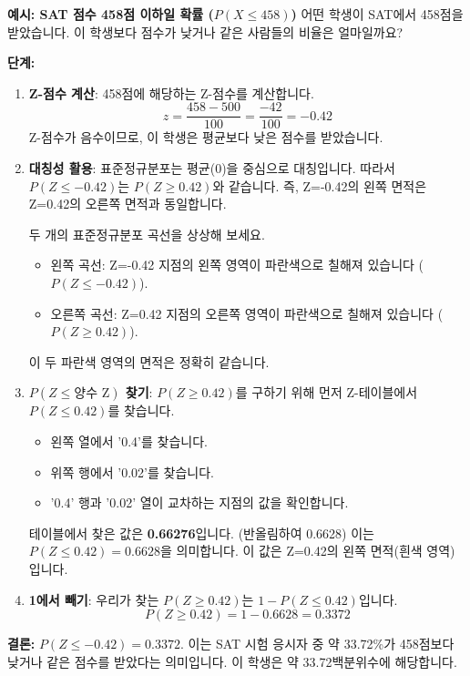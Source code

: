 \documentclass[11pt,a4paper]{article}
\theoremstyle{definition}
\begin{document}
\begin{examplebox}
\textbf{예시: SAT 점수 458점 이하일 확률 ($P(X \le 458)$)}
어떤 학생이 SAT에서 458점을 받았습니다. 이 학생보다 점수가 낮거나 같은 사람들의 비율은 얼마일까요?

\textbf{단계:}
\begin{enumerate}
    \item \textbf{Z-점수 계산}: 458점에 해당하는 Z-점수를 계산합니다.
    \[ z = \frac{458 - 500}{100} = \frac{-42}{100} = -0.42 \]
    Z-점수가 음수이므로, 이 학생은 평균보다 낮은 점수를 받았습니다.
    \item \textbf{대칭성 활용}: 표준정규분포는 평균(0)을 중심으로 대칭입니다. 따라서 $P(Z \le -0.42)$는 $P(Z \ge 0.42)$와 같습니다. 즉, Z=-0.42의 왼쪽 면적은 Z=0.42의 오른쪽 면적과 동일합니다.
    \begin{tcolorbox}[title=\textbf{시각적 이해: 대칭성}, colback=lightblue!50!white, colframe=darkblue]
    두 개의 표준정규분포 곡선을 상상해 보세요.
    \begin{itemize}
        \item 왼쪽 곡선: Z=-0.42 지점의 왼쪽 영역이 파란색으로 칠해져 있습니다 ($P(Z \le -0.42)$).
        \item 오른쪽 곡선: Z=0.42 지점의 오른쪽 영역이 파란색으로 칠해져 있습니다 ($P(Z \ge 0.42)$).
    \end{itemize}
    이 두 파란색 영역의 면적은 정확히 같습니다.
    \end{tcolorbox}
    \item \textbf{$P(Z \le \text{양수 Z})$ 찾기}: $P(Z \ge 0.42)$를 구하기 위해 먼저 Z-테이블에서 $P(Z \le 0.42)$를 찾습니다.
    \begin{itemize}
        \item 왼쪽 열에서 '0.4'를 찾습니다.
        \item 위쪽 행에서 '0.02'를 찾습니다.
        \item '0.4' 행과 '0.02' 열이 교차하는 지점의 값을 확인합니다.
    \end{itemize}
    테이블에서 찾은 값은 \textbf{0.66276}입니다. (반올림하여 0.6628)
    이는 $P(Z \le 0.42) = 0.6628$을 의미합니다. 이 값은 Z=0.42의 왼쪽 면적(흰색 영역)입니다.
    \item \textbf{1에서 빼기}: 우리가 찾는 $P(Z \ge 0.42)$는 $1 - P(Z \le 0.42)$입니다.
    \[ P(Z \ge 0.42) = 1 - 0.6628 = 0.3372 \]
\end{enumerate}
\textbf{결론:} $P(Z \le -0.42) = 0.3372$. 이는 SAT 시험 응시자 중 약 33.72\%가 458점보다 낮거나 같은 점수를 받았다는 의미입니다. 이 학생은 약 33.72백분위수에 해당합니다.
\end{examplebox}
\end{document}

